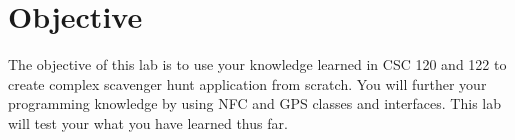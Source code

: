 \section{Objective}
The objective of this lab is to use your knowledge learned in CSC 120 and 122 to create complex scavenger hunt application from scratch.
You will further your programming knowledge by using NFC and GPS classes and interfaces.
This lab will test your what you have learned thus far.
